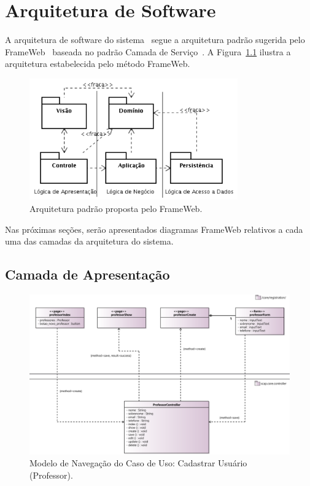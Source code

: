 
\chapter{Arquitetura de Software}
\label{sec-arquitetura}

A arquitetura de software do sistema~\imprimirtitulo \,\,segue a arquitetura padrão sugerida pelo FrameWeb~\cite{souza:masterthesis07,souza-et-al:iism09} baseada no padrão Camada de Serviço~\cite{fowler:book02}. A Figura~\ref{figura-arquitetura-padrao} ilustra a arquitetura estabelecida pelo método FrameWeb.

\begin{figure}[h]
	\centering
	\includegraphics[width=0.8\textwidth]{figuras/figura-arquitetura-padrao.png}
	\caption{Arquitetura padrão proposta pelo FrameWeb.}
	\label{figura-arquitetura-padrao}
\end{figure}

Nas próximas seções, serão apresentados diagramas FrameWeb relativos a cada uma das camadas da arquitetura do sistema.


\section{Camada de Apresentação}
\label{sec-arquitetura-apresentacao}


\begin{figure}[h]
	\centering
	\includegraphics[width=1\textwidth]{figuras/figura-arquitetura-navegacao1.png}
	\caption{Modelo de Navegação do Caso de Uso: Cadastrar Usuário (Professor).}
	\label{figura-arquitetura-navegacao1}
\end{figure}

